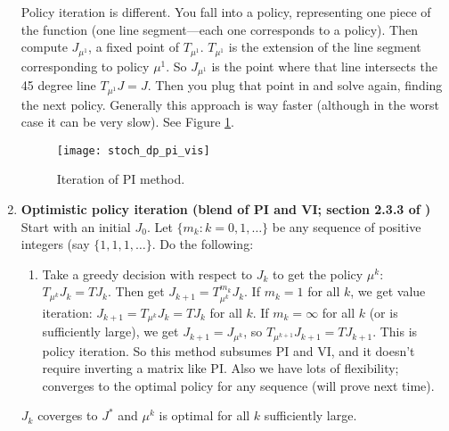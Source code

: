 \begin{enumerate}
Policy iteration is different. You fall into a policy, representing one piece of the function (one line segment---each one corresponds to a policy). Then compute \(J_{\mu^1}\), a fixed point of \(T_{\mu^1}\). \(T_{\mu^1}\) is the extension of the line segment corresponding to policy \(\mu^1\). So \(J_{\mu^1}\) is the point where that line intersects the 45 degree line \(T_{\mu^1} J = J\). Then you plug that point in and solve again, finding the next policy. Generally this approach is way faster (although in the worst case it can be very slow). See Figure \ref{stoch_dp_pi_vis_fig}. 

\begin{figure}[htbp]
\begin{center}
\texttt{[image: stoch\_dp\_pi\_vis]}
\caption{Iteration of PI method.}
\label{stoch_dp_pi_vis_fig}
\end{center}
\end{figure}


\item \textbf{Optimistic policy iteration (blend of PI and VI; section 2.3.3 of \citet{v2_bertsekas2012dynamic})} Start with an initial \(J_0\). Let \(\{m_k: k = 0, 1, \ldots\}\) be any sequence of positive integers (say \(\{1, 1, 1, \ldots\}\). Do the following:

\begin{enumerate}

\item Take a greedy decision with respect to \(J_k\) to get the policy \(\mu^k\): \(T_{\mu^k} J_k = T J_k\). Then get \(J_{k+1} = T_{\mu^k}^{m_k} J_k\). If \(m_k = 1\) for all \(k\), we get value iteration: \(J_{k+1} = T_{\mu^k} J_k = T J_k\) for all \(k\). If \(m_k = \infty\) for all \(k\) (or is sufficiently large), we get \(J_{k+1} = J_{\mu^k}\), so \(T_{\mu^{k+1}} J_{k+1} = T J_{k+1}\). This is policy iteration. So this method subsumes PI and VI, and it doesn't require inverting a matrix like PI. Also we have lots of flexibility; converges to the optimal policy for any sequence (will prove next time).

\end{enumerate}

\begin{theorem}

\(J_k\) coverges to \(J^*\) and \(\mu^k\) is optimal for all \(k\) sufficiently large.

\end{theorem}


\end{enumerate}
